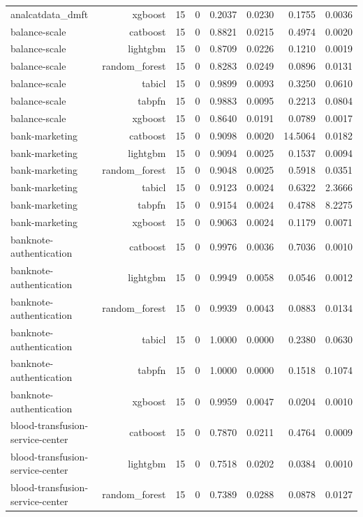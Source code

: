 \begin{table}[htbp]
\begin{tabular}{lrrrrrrr}
analcatdata\_dmft & xgboost & 15 & 0 & 0.2037 & 0.0230 & 0.1755 & 0.0036 \\
balance-scale & catboost & 15 & 0 & 0.8821 & 0.0215 & 0.4974 & 0.0020 \\
balance-scale & lightgbm & 15 & 0 & 0.8709 & 0.0226 & 0.1210 & 0.0019 \\
balance-scale & random\_forest & 15 & 0 & 0.8283 & 0.0249 & 0.0896 & 0.0131 \\
balance-scale & tabicl & 15 & 0 & 0.9899 & 0.0093 & 0.3250 & 0.0610 \\
balance-scale & tabpfn & 15 & 0 & 0.9883 & 0.0095 & 0.2213 & 0.0804 \\
balance-scale & xgboost & 15 & 0 & 0.8640 & 0.0191 & 0.0789 & 0.0017 \\
bank-marketing & catboost & 15 & 0 & 0.9098 & 0.0020 & 14.5064 & 0.0182 \\
bank-marketing & lightgbm & 15 & 0 & 0.9094 & 0.0025 & 0.1537 & 0.0094 \\
bank-marketing & random\_forest & 15 & 0 & 0.9048 & 0.0025 & 0.5918 & 0.0351 \\
bank-marketing & tabicl & 15 & 0 & 0.9123 & 0.0024 & 0.6322 & 2.3666 \\
bank-marketing & tabpfn & 15 & 0 & 0.9154 & 0.0024 & 0.4788 & 8.2275 \\
bank-marketing & xgboost & 15 & 0 & 0.9063 & 0.0024 & 0.1179 & 0.0071 \\
banknote-authentication & catboost & 15 & 0 & 0.9976 & 0.0036 & 0.7036 & 0.0010 \\
banknote-authentication & lightgbm & 15 & 0 & 0.9949 & 0.0058 & 0.0546 & 0.0012 \\
banknote-authentication & random\_forest & 15 & 0 & 0.9939 & 0.0043 & 0.0883 & 0.0134 \\
banknote-authentication & tabicl & 15 & 0 & 1.0000 & 0.0000 & 0.2380 & 0.0630 \\
banknote-authentication & tabpfn & 15 & 0 & 1.0000 & 0.0000 & 0.1518 & 0.1074 \\
banknote-authentication & xgboost & 15 & 0 & 0.9959 & 0.0047 & 0.0204 & 0.0010 \\
blood-transfusion-service-center & catboost & 15 & 0 & 0.7870 & 0.0211 & 0.4764 & 0.0009 \\
blood-transfusion-service-center & lightgbm & 15 & 0 & 0.7518 & 0.0202 & 0.0384 & 0.0010 \\
blood-transfusion-service-center & random\_forest & 15 & 0 & 0.7389 & 0.0288 & 0.0878 & 0.0127 \\

\end{tabular}
\end{table}
